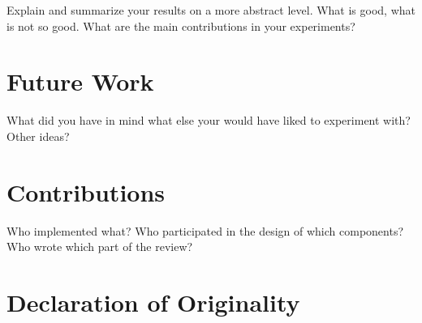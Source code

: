 \documentclass[11pt]{article}
\begin{document}
Explain and summarize your
results on a more abstract level. What is good, what is not so
good. What are the main contributions in your experiments?


\section{Future Work}

What did you have in mind what else your
would have liked to experiment with? Other ideas?





\appendix

\section{Contributions}
Who implemented what?
Who participated in the design of which components?
Who wrote which part of the review?
\section{Declaration of Originality}
\label{sec:appendix}
\end{document}
